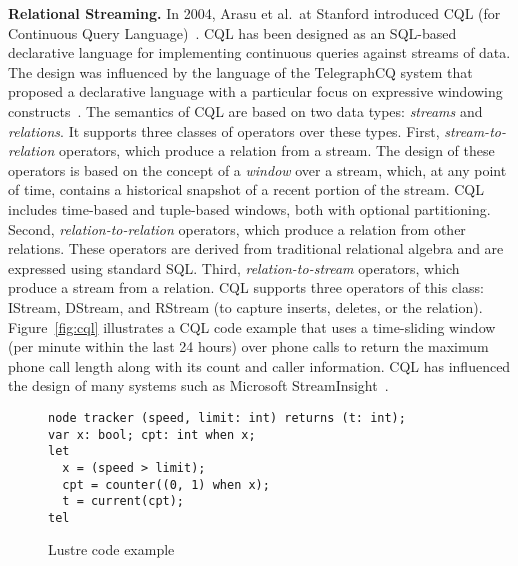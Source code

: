 \textbf{Relational Streaming.}
In 2004, Arasu et al.\ at Stanford introduced CQL (for Continuous
Query Language)~\cite{arasu_widom_2004}. CQL has been designed as an
SQL-based declarative language for implementing continuous queries
against streams of data. The design was influenced by the language of
the TelegraphCQ system that proposed a declarative language with a
particular focus on expressive windowing
constructs~\cite{chandrasekaran_et_al_2003}. The semantics of CQL are
based on two data types: \emph{streams} and \emph{relations}. It
supports three classes of operators over these types. First,
\emph{stream-to-relation} operators, which produce a relation from a
stream.  The design of these operators is based on the concept of a
\emph{window} over a stream, which, at any point of time, contains a
historical snapshot of a recent portion of the stream. CQL includes
time-based and tuple-based windows, both with optional
partitioning. Second, \emph{relation-to-relation} operators, which
produce a relation from other relations. These operators are derived
from traditional relational algebra and are expressed using standard
SQL. Third, \emph{relation-to-stream} operators, which produce a
stream from a relation. CQL supports three operators of this class:
IStream, DStream, and RStream (to capture inserts, deletes, or the
relation).  Figure~\ref{fig:cql} illustrates a CQL code example that
uses a time-sliding window (per minute within the last 24 hours) over
phone calls to return the maximum phone call length along with its
count and caller information. CQL has influenced the design of many
systems such as Microsoft StreamInsight~\cite{ali_et_al_2009}.


\begin{figure}
  \begin{lstlisting}
node tracker (speed, limit: int) returns (t: int);
var x: bool; cpt: int when x;
let
  x = (speed > limit);
  cpt = counter((0, 1) when x);
  t = current(cpt);
tel
  \end{lstlisting}
  \caption{\label{fig:lustre} Lustre code example}
\end{figure}

